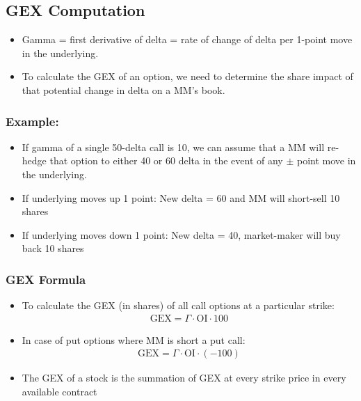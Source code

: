 \documentclass[12pt, oneside]{article}
\begin{document}
\subsection{GEX Computation}
\begin{itemize}
    \item Gamma = first derivative of delta = rate of change of delta per 1-point move in the underlying.
    \item To calculate the GEX of an option, we need to determine the share impact of that potential change in delta on a MM's book.
\end{itemize}

\subsubsection{Example:}
\begin{itemize}
    \item If gamma of a single 50-delta call is 10, we can assume that a MM will re-hedge that option to either 40 or 60 delta in the event of any $\pm$ point move in the underlying.
    \item If underlying moves up 1 point: New delta = 60 and MM will short-sell 10 shares
    \item If underlying moves down 1 point: New delta = 40, market-maker will buy back 10 shares
\end{itemize}

\subsubsection{GEX Formula}

\begin{itemize}
    \item To calculate the GEX (in shares) of all call options at a particular strike:
    \begin{align}
        \text{GEX} = \Gamma \cdot \text{OI} \cdot 100
    \end{align}
    \item In case of put options where MM is short a put call:
    \begin{align}
        \text{GEX} = \Gamma \cdot \text{OI} \cdot (-100)
    \end{align}
    \item The GEX of a stock is the summation of GEX at every strike price in every available contract
\end{itemize}
   
\end{document}
